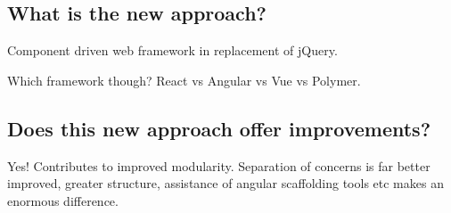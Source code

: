 \subsection{What is the new approach?}

Component driven web framework in replacement of jQuery. 

Which framework though? React vs Angular vs Vue vs Polymer.

\subsection{Does this new approach offer improvements?}

Yes! Contributes to improved modularity. Separation of concerns is far better improved, greater structure, assistance of angular scaffolding tools etc makes an enormous difference.

%
%
%
%
%
%
%
%